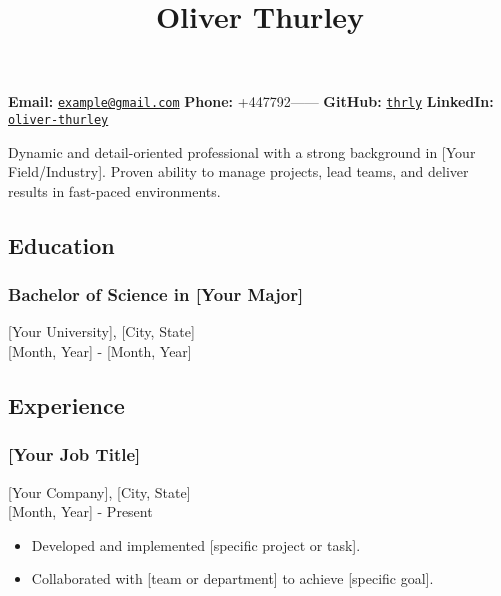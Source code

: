 \documentclass[11pt,a4paper]{article}
\title{\textcolor{devblue}{\large Oliver Thurley}}
\author{}
\date{}
\providecommand{\tightlist}{%
  \setlength{\itemsep}{0pt}\setlength{\parskip}{0pt}}
\begin{document}
\maketitle

\vspace{-1em}
\noindent\textbf{Email:} \href{mailto:example@gmail.com}{\texttt{example@gmail.com}} \hspace{1em}
\textbf{Phone:} +447792------ \hspace{1em}
\textbf{GitHub:} \href{https://github.com/thrly}{\texttt{thrly}} \hspace{1em}
\textbf{LinkedIn:} \href{https://linkedin.com/in/oliver-thurley}{\texttt{oliver-thurley}}

\vspace{1em}

Dynamic and detail-oriented professional with a strong background in
{[}Your Field/Industry{]}. Proven ability to manage projects, lead
teams, and deliver results in fast-paced environments.

\subsection{Education}\label{education}

\subsubsection{Bachelor of Science in {[}Your
Major{]}}\label{bachelor-of-science-in-your-major}

{[}Your University{]}, {[}City, State{]}\\
{[}Month, Year{]} - {[}Month, Year{]}

\subsection{Experience}\label{experience}

\subsubsection{{[}Your Job Title{]}}\label{your-job-title}

{[}Your Company{]}, {[}City, State{]}\\
{[}Month, Year{]} - Present

\begin{itemize}
\tightlist
\item
  Developed and implemented {[}specific project or task{]}.
\item
  Collaborated with {[}team or department{]} to achieve {[}specific
  goal{]}.
\end{itemize}
\end{document}
